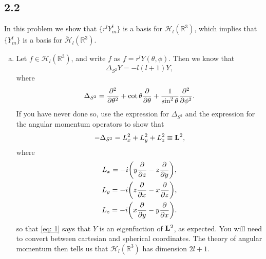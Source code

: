 \documentclass[10pt]{article}
\begin{document}
\subsection{2.2}
In this problem we show that $\{r^l Y_m^l\}$ is a basis for $\mathcal{H}_l(\mathbb{R}^3)$, which implies that $\{Y_m^l\}$ is a basis for $\tilde{\mathcal{H}}_l(\mathbb{R}^3)$.
\begin{enumerate}[(a)]
	\item Let $f \in \mathcal{H}_l(\mathbb{R}^3)$, and write $f$ as $f = r^l Y(\theta, \phi)$.
	Then we know that
	\begin{equation}
		\Delta_{S^2} Y = -l(l+1) Y, \label{eq: 1}
	\end{equation}
	where
	\begin{equation}
		\Delta_{S^2} = \pdv[2]{\theta} + \cot{\theta} \pdv{\theta} + \frac{1}{\sin^2{\theta}}\pdv[2]{\phi}.
	\end{equation}
	If you have never done so, use the expression for $\Delta_{S^2}$ and the expression for the angular momentum operators to show that
	\begin{equation}
		-\Delta_{S^2} = L_x^2 + L_y^2 + L_z^2 \equiv \vb{L}^2,
	\end{equation}
	where
	\begin{gather*}
		L_x = -i\qty(y \pdv{z} - z \pdv{y}), \\
		L_y = -i\qty(z \pdv{x} - x \pdv{z}), \\
		L_z = -i\qty(x \pdv{y} - y \pdv{x}). \\
	\end{gather*}
	so that \eqref{eq: 1} says that $Y$ is an eigenfuction of $\vb{L}^2$, as expected. You will need to convert between cartesian and spherical coordinates. The theory of angular momentum then tells us that $\mathcal{H}_l(\mathbb{R}^3)$ has dimension $2l+1$.


\end{enumerate}
\end{document}
